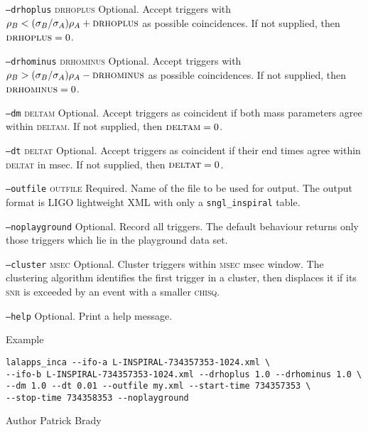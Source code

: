 \begin{entry}
\begin{entry}
\item[\texttt{--drhoplus} \textsc{drhoplus}] Optional. Accept triggers with
$\rho_B < (\sigma_B/\sigma_A) \rho_A + \textsc{drhoplus}$ as
possible coincidences.  If not supplied,  then $\textsc{drhoplus} =
0$.

\item[\texttt{--drhominus} \textsc{drhominus}] Optional. Accept triggers with
$\rho_B > (\sigma_B/\sigma_A) \rho_A - \textsc{drhominus}$ as
possible coincidences.  If not supplied,  then $\textsc{drhominus} =
0$.

\item[\texttt{--dm} \textsc{deltam}] Optional. Accept triggers as coincident if
both mass parameters agree within \textsc{deltam}.  If not supplied,  then 
$\textsc{deltam} = 0$.

\item[\texttt{--dt} \textsc{deltat}] Optional. Accept triggers as coincident if
their end times agree within \textsc{deltat} in msec.  If not supplied,  then 
$\textsc{deltat} = 0$.

\item[\texttt{--outfile} \textsc{outfile}] Required.  Name of the file
to be used for output.  The output format is LIGO lightweight XML with
only a \texttt{sngl\_inspiral} table.

\item[\texttt{--noplayground}] Optional.  Record all triggers.  The
default behaviour returns only those triggers which lie in the
playground data set.  

\item[\texttt{--cluster} \textsc{msec}] Optional.  Cluster triggers
within \textsc{msec} msec window.   The clustering algorithm
identifies the first trigger in a cluster,  then displaces it if its
\textsc{snr} is exceeded by an event with a smaller \textsc{chisq}.

\item[\texttt{--help}] Optional.  Print a help message.
\end{entry}

\item[Example]
\begin{verbatim}
lalapps_inca --ifo-a L-INSPIRAL-734357353-1024.xml \
--ifo-b L-INSPIRAL-734357353-1024.xml --drhoplus 1.0 --drhominus 1.0 \
--dm 1.0 --dt 0.01 --outfile my.xml --start-time 734357353 \
--stop-time 734358353 --noplayground
\end{verbatim}
\item[Author] 
Patrick Brady
\end{entry}
\clearpage


